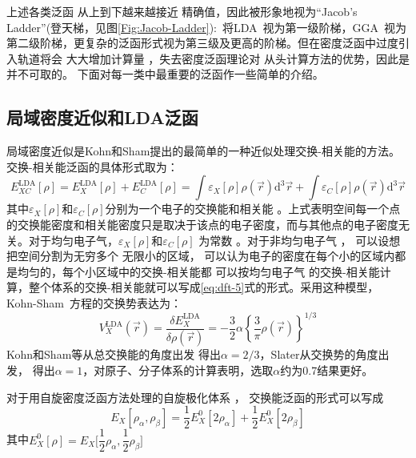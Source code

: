 上述{各类}泛函%
从上到下越来越接近%
精确值，因此被形象地视为``Jacob's Ladder''(登天梯，见图\ref{Fig:Jacob-Ladder}):~将\textrm{LDA~}视为第一级阶梯，\textrm{GGA~}视为第二级阶梯，更复杂的泛函形式视为第三级及更高的阶梯。\cite{PRL91-146401_2003}但在密度泛函中过度引入轨道将会%
{大大增加}计算量%
，失去密度泛函理论对%
从头计算方法的优势，因此是{并}不可取的。
下面对每一类中最重要的泛函作一些简单的介绍。

\subsection{局域密度近似和LDA泛函}
局域密度近似是Kohn和Sham提出的最简单的一种近似处理交换-相关能的方法。交换-相关能{泛函}的具体形式取为：
\begin{equation}
  \label{eq:dft-5}
  E_{XC}^{\mathrm{LDA}}[\rho]=E_X^{\mathrm{LDA}}[\rho]+E_C^{\mathrm{LDA}}[\rho]=\int\varepsilon_X[\rho]\rho(\vec{r}) \textrm{d}^3\vec{r}+\int\varepsilon_C[\rho]\rho(\vec{r}) \textrm{d}^3\vec{r}
\end{equation}
其中$\varepsilon_X[\rho]$和$\varepsilon_C[\rho]$分别为{一个电子的}交换能和相关能%
。上式表明空间每一个点的交换能密度和相关能密度只是取决于该点的电子密度，而与其他点的电子密度无关。对{于均匀电子气，}$\varepsilon_X[\rho]$和$\varepsilon_C[\rho]$%
{为常数%
。}对于非均匀电子气%
，%
{可以设想}把空间分割为无穷多个%
{无限}小的区域，%
{可以认为}电子的密度在每个小的区域内都是均匀的，每个小区域中的交换-相关能都%
{可以按}均匀电子气%
的交换-相关能{计算}，整个体系的交换-相关能就可以写成\eqref{eq:dft-5}式的形式。{采用}这种模型{，}%
\textrm{Kohn-Sham~}方程的交换势表达为：
\begin{equation} \label{eq:dft-6}
	V_X^{\mathrm{LDA}}(\vec{r}) =\dfrac {\delta E_X^{\mathrm{LDA}}}{\delta\rho(\vec{r}) }=-\dfrac 32\alpha\left\{\dfrac3\pi\rho(\vec{r}) \right\}^{1/3}
\end{equation}
Kohn和Sham等从总交换能的角度出发%
{得}出$\alpha=2/3$\cite{PRA140-1133_1965}，Slater从交换势的角度出发，%
{得}出$\alpha=1$\cite{PR81-385_1951}，对原子、分子体系的计算表明，选取$\alpha$约为0.7\cite{AQC6-1_1972,Slater-4_1974}结果更好。

对于用自旋密度泛函方法处理的自旋极化体系%
，%
交换能{泛函的}形式可以写成\cite{PRA20-397_1979}
\begin{equation} \label{eq:dft-7}
E_X[\rho_{\alpha},\rho_{\beta}]=\frac12E_X^{0}[2\rho_{\alpha}]+\frac12E_X^{0}[2\rho_{\beta}]
\end{equation}
其中$E_X^{0}[\rho]=E_X\bigl[\dfrac 12\rho_{\alpha},\dfrac 12\rho_{\beta}\bigr]$

